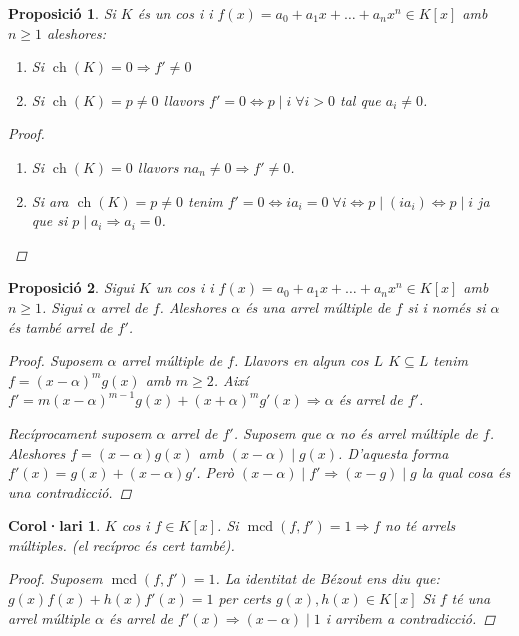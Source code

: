 \documentclass[a4paper,11pt]{report}
\renewcommand{\div}{\mid}
\DeclareMathOperator{\mcd}{mcd}
\DeclareMathOperator{\ch}{ch}
\renewcommand{\implies}{\Leftrightarrow}
\newcommand{\im}{\Rightarrow}
\theoremstyle{theorem}
\newtheorem{proposicio}{\normalfont \sffamily\bfseries Proposició}[section]
\newtheorem{col}{\normalfont \sffamily\bfseries Corol·lari}[section]
\theoremstyle{definition}
\begin{document}
\begin{proposicio}
Si $K$ és un cos i i $f(x)=a_0+a_1x+\ldots+a_nx^n\in K[x]$ amb $n\geq 1$ aleshores:\begin{enumerate}
	\item Si $\ch(K)=0\im f'\neq 0$\item Si $\ch(K)=p\neq 0$ llavors $f'=0\implies p\div i\;\forall i>0$ tal que $a_i\neq 0$. 
\end{enumerate}
\begin{proof}
	\begin{enumerate}
		\item Si $\ch(K)=0$ llavors $na_n\neq0\im f'\neq0$.
		\item Si ara $\ch(K)=p\neq0$ tenim $f'=0\implies ia_i=0\;\forall i\implies p\div(ia_i)\implies p\div i$ ja que si $p\div a_i\im a_i=0$.
	\end{enumerate}
\end{proof}
\end{proposicio}
\begin{proposicio}
	Sigui $K$ un cos i i $f(x)=a_0+a_1x+\ldots+a_nx^n\in K[x]$ amb $n\geq 1$. Sigui $\alpha$ arrel de $f$. Aleshores $\alpha$ és una arrel múltiple de $f$ si i només si $\alpha$ és també arrel de $f'$.
	\begin{proof}
	Suposem $\alpha $ arrel múltiple de $f$. Llavors en algun cos $L$ $K\subseteq L$ tenim $f=(x-\alpha)^mg(x)$ amb $m\geq 2$. Així $f'=m(x-\alpha)^{m-1}g(x)+(x+\alpha)^mg'(x)\im \alpha $ és arrel de $f'$.
	
	Recíprocament suposem $\alpha$ arrel de $f'$. Suposem que $\alpha$ no és arrel múltiple de $f$. Aleshores $f=(x-\alpha)g(x)$ amb $(x-\alpha)\div g(x)$. D'aquesta forma $f'(x)=g(x)+(x-\alpha)g'$. Però $(x-\alpha)\div f'\im (x-g)\div g$ la qual cosa és una contradicció.
	\end{proof}

\end{proposicio}
\begin{col}
	$K$ cos i $f\in K[x]$. Si $\mcd(f,f')=1\im f$ no té arrels múltiples. (el recíproc és cert també).
	\begin{proof}
		Suposem $\mcd(f,f')=1$. La identitat de Bézout ens diu que: $g(x)f(x)+h(x)f'(x)=1$ per certs $g(x),h(x)\in K[x]$
	Si $f$ té una arrel múltiple $\alpha$ és arrel de $f'(x)\im (x-\alpha)\div 1$ i arribem a contradicció.	\end{proof}
\end{col}
\end{document}
